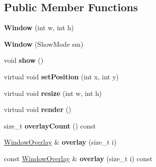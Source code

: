\subsection*{Public Member Functions}
\begin{DoxyCompactItemize}
\item 
\hypertarget{class_tempest_1_1_window_a78facfb5b14b45089de94e6ff26373cd}{{\bfseries Window} (int w, int h)}\label{class_tempest_1_1_window_a78facfb5b14b45089de94e6ff26373cd}

\item 
\hypertarget{class_tempest_1_1_window_aa7ee382fc65116901f1f94e12b579340}{{\bfseries Window} (Show\+Mode sm)}\label{class_tempest_1_1_window_aa7ee382fc65116901f1f94e12b579340}

\item 
\hypertarget{class_tempest_1_1_window_a8f986e19a11c4c97ed8e6ad3d0e648b7}{void {\bfseries show} ()}\label{class_tempest_1_1_window_a8f986e19a11c4c97ed8e6ad3d0e648b7}

\item 
\hypertarget{class_tempest_1_1_window_a397289ae6968f13beec07f071560a4e7}{virtual void {\bfseries set\+Position} (int x, int y)}\label{class_tempest_1_1_window_a397289ae6968f13beec07f071560a4e7}

\item 
\hypertarget{class_tempest_1_1_window_a86ff9b43289e79e46c33a9ff5e8303b5}{virtual void {\bfseries resize} (int w, int h)}\label{class_tempest_1_1_window_a86ff9b43289e79e46c33a9ff5e8303b5}

\item 
\hypertarget{class_tempest_1_1_window_a2835781d50184e43c3992f6a595b5715}{virtual void {\bfseries render} ()}\label{class_tempest_1_1_window_a2835781d50184e43c3992f6a595b5715}

\item 
\hypertarget{class_tempest_1_1_window_a34d8191e6e04b0ad5e0349ae86997a9a}{size\+\_\+t {\bfseries overlay\+Count} () const }\label{class_tempest_1_1_window_a34d8191e6e04b0ad5e0349ae86997a9a}

\item 
\hypertarget{class_tempest_1_1_window_ad2ac3aa24b9de95cf294159a66ae2848}{\hyperlink{struct_tempest_1_1_window_overlay}{Window\+Overlay} \& {\bfseries overlay} (size\+\_\+t i)}\label{class_tempest_1_1_window_ad2ac3aa24b9de95cf294159a66ae2848}

\item 
\hypertarget{class_tempest_1_1_window_ae8c3733a022d749dff27b15af4fc1dc1}{const \hyperlink{struct_tempest_1_1_window_overlay}{Window\+Overlay} \& {\bfseries overlay} (size\+\_\+t i) const }\label{class_tempest_1_1_window_ae8c3733a022d749dff27b15af4fc1dc1}


\end{DoxyCompactItemize}
